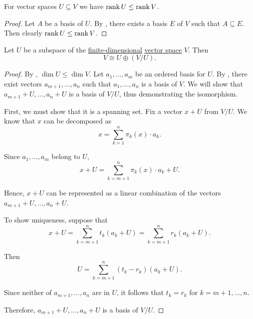 \begin{lemma}\label{thm:vector_space_dimension_monotonicity}
  For vector spaces \( U \subseteq V \) we have \( \operatorname{rank} U \leq \operatorname{rank} V \).
\end{lemma}
\begin{proof}
  Let \( A \) be a basis of \( U \). By , there exists a basis \( E \) of \( V \) such that \( A \subseteq E \). Then clearly \( \operatorname{rank} U \leq \operatorname{rank} V \).
\end{proof}

\begin{proposition}\label{thm:rank_nullity_via_subspaces}
  Let \( U \) be a subspace of the \hyperref[thm:vector_space_dimension]{finite-dimensional} \hyperref[def:vector_space]{vector space} \( V \). Then
  \begin{equation*}
    V \cong U \oplus (V / U).
  \end{equation*}
\end{proposition}
\begin{proof}
  By , \( \dim U \leq \dim V \). Let \( a_1, \ldots, a_m \) be an ordered basis for \( U \). By , there exist vectors \( a_{m+1}, \ldots, a_n \) such that \( a_1, \ldots, a_n \) is a basis of \( V \). We will show that \( a_{m+1} + U, \ldots, a_n + U \) is a basis of \( V / U \), thus demonstrating the isomorphism.

  First, we must show that it is a spanning set. Fix a vector \( x + U \) from \( V / U \). We know that \( x \) can be decomposed as
  \begin{equation*}
    x = \sum_{k=1}^n \pi_k(x) \cdot a_k.
  \end{equation*}

  Since \( a_1, \ldots, a_m \) belong to \( U \),
  \begin{equation*}
    x + U = \sum_{k={m+1}}^n \pi_k(x) \cdot a_k + U.
  \end{equation*}

  Hence, \( x + U \) can be represented as a linear combination of the vectors \( a_{m+1} + U, \ldots, a_n + U \).

  To show uniqueness, suppose that
  \begin{equation*}
    x + U = \sum_{k={m+1}}^n t_k (a_k + U) = \sum_{k={m+1}}^n r_k (a_k + U).
  \end{equation*}

  Then
  \begin{equation*}
    U = \sum_{k={m+1}}^n (t_k - r_k) (a_k + U).
  \end{equation*}

  Since neither of \( a_{m+1}, \ldots, a_n \) are in \( U \), it follows that \( t_k = r_k \) for \( k = m + 1, \ldots, n \).

  Therefore, \( a_{m+1} + U, \ldots, a_n + U \) is a basis of \( V / U \).
\end{proof}


